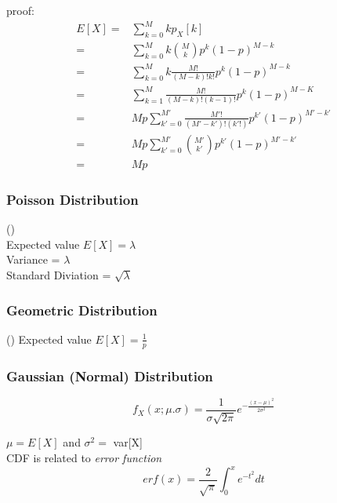 proof:
\begin{equation*}
	\begin{split}
		E[X]
			=& 
				\sum^{M}_{k=0}kp_{X}[k]\\
			=&
				\sum^{M}_{k=0}k\binom{M}{k}p^{k}(1-p)^{M-k}\\
			=&
				\sum^{M}_{k=0}k\frac{M!}{(M-k)!k!}p^{k}(1-p)^{M-k}\\
			=&
				\sum^{M}_{k=1}\frac{M!}{(M-k)!(k-1)!}p^{k}(1-p)^{M-K}\\
			=&
				Mp\sum^{M'}_{k'=0}\frac{M'!}{(M'-k')!(k'!)}p^{k'}(1-p)^{M'-k'}\\
			=&
				Mp\sum^{M'}_{k'=0}\binom{M'}{k'}p^{k'}(1-p)^{M'-k'}\\
			=&
				Mp
	\end{split}
\end{equation*}

\subsubsection{Poisson Distribution}
 ()\\
{\color{blue}Expected value $E[X]=\lambda$}\\
{\color{blue} Variance = $\lambda$}\\
{\color{blue} Standard Diviation = $\sqrt{\lambda}$}\\

 
 \subsubsection{Geometric Distribution}
()
 {\color{blue}Expected value $E[X]=\frac{1}{p}$}\\


\subsubsection{Gaussian (Normal) Distribution} 

\begin{equation*}
	f_{X}(x;\mu.\sigma)=\frac{1}{\sigma\sqrt{2\pi}}e^{-\frac{(x-\mu)^{2}}{2\sigma^{2}}}
\end{equation*}

$\mu=E[X]$ and $\sigma^{2}=$ var[X]\\

CDF is related to \emph{error function}
\begin{equation*}
	erf(x)=\frac{2}{\sqrt{\pi}}\int^{x}_{0}e^{-t^{2}}dt
\end{equation*}


